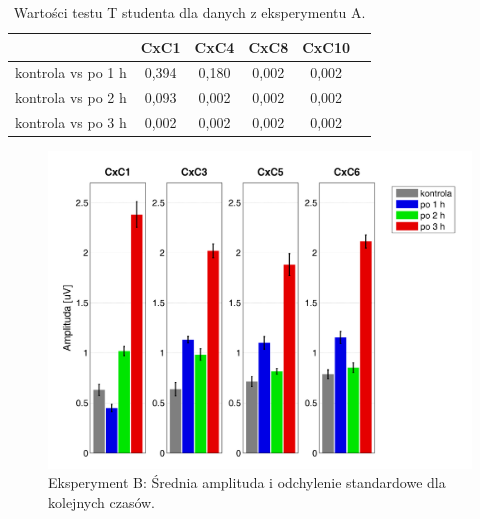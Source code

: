 \documentclass{pracamgr_2}
\begin{document}
\begin{table}[htdp]
	\caption{Wartości testu T studenta dla danych z eksperymentu A.}
	\begin{center}
		\begin{tabularx}{0.9\textwidth}{l C C C C C}
			\toprule
			\textbf{} & \textbf{CxC1} & \textbf{CxC4} & \textbf{CxC8} & \textbf{CxC10} \\
			\midrule
			kontrola vs po 1 h & 0,394 & 0,180 & 0,002 & 0,002\\
			kontrola vs po 2 h & 0,093 & 0,002 & 0,002 & 0,002\\
			kontrola vs po 3 h & 0,002 & 0,002 & 0,002 & 0,002\\
			\bottomrule
		\end{tabularx}
	\end{center}
	\label{tab:kontrola_test_T}
\end{table}

\begin{figure}[htdp]
	\begin{center}
		\includegraphics[scale=0.6]{beta3_stat_CxC.png}
	\end{center}
	\caption{Eksperyment B: Średnia amplituda i odchylenie standardowe dla kolejnych czasów.}
	\label{rys:beta3_stat_CxC}
\end{figure}
\end{document}

